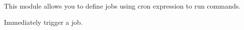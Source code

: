 
This module allows you to define jobs using cron expression to run commands.

Immediately trigger a job.